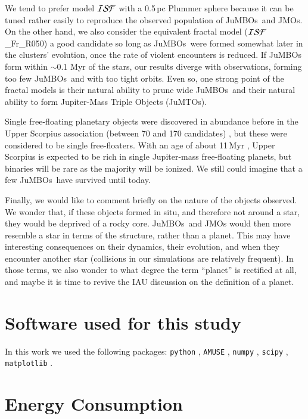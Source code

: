 \documentclass[submission,phys]{lib/SciPost}
\newcommand{\jumbos}{\mbox{JuMBOs}}
\begin{document}
We tend to prefer model ${\cal ISF}$ with a 0.5\,pc Plummer sphere
because it can be tuned rather easily to reproduce the observed
population of \jumbos\, and JMOs. On the other hand, we also consider
the equivalent fractal model (${\cal ISF}$\_Fr\_R050) a good candidate
so long as \jumbos\ were formed somewhat later in the clusters'
evolution, once the rate of violent encounters is reduced.  If \jumbos\,
form within $\sim 0.1$ Myr of the stars, our results diverge with
observations, forming too few \jumbos\, and with too tight
orbits. Even so, one strong point of the fractal models is their
natural ability to prune wide \jumbos\, and their natural ability to
form Jupiter-Mass Triple Objects (JuMTOs).

Single free-floating planetary objects were discovered in abundance
before in the Upper Scorpius association (between 70 and 170
candidates) \cite{2022NatAs...6...89M}, but these were considered to
be single free-floaters.  With an age of about 11\,Myr
\cite{2022NatAs...6...89M}, Upper Scorpius is expected to be rich in
single Jupiter-mass free-floating planets, but binaries will be rare
as the majority will be ionized. We still could imagine that a few
\jumbos\, have survived until today.

Finally, we would like to comment briefly on the nature of the objects
observed. We wonder that, if these objects formed in situ, and
therefore not around a star, they would be deprived of a rocky core.
\jumbos\, and JMOs would then more resemble a star in terms of the
structure, rather than a planet. This may have interesting
consequences on their dynamics, their evolution, and when they
encounter another star (collisions in our simulations are relatively
frequent). In those terms, we also wonder to what degree the term
``planet'' is rectified at all, and maybe it is time to revive the IAU
discussion on the definition of a planet.

\section*{Software used for this study}

In this work we used the following packages: \texttt{python}
\cite{10.5555/1593511}, \texttt{AMUSE} \cite{2018araa.book.....P},
\texttt{numpy} \cite{Oliphant2006ANumPy}, \texttt{scipy}
\cite{2020SciPy-NMeth}, \texttt{matplotlib}
\cite{2007CSE.....9...90H}.

\section*{Energy Consumption}
\end{document}

